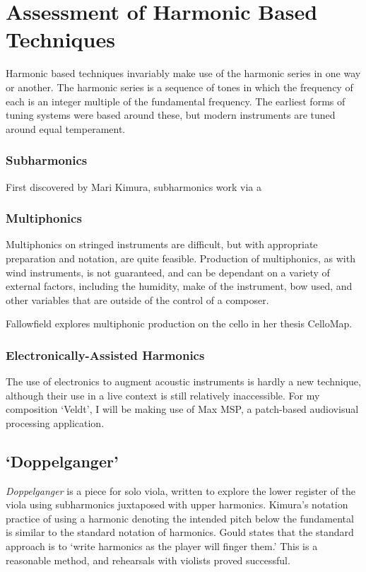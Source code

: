 
\chapter[Assessment of Harmonic Based Techniques]{Assessment of Harmonic Based Techniques}

Harmonic based techniques invariably make use of the harmonic series in one way or another. The harmonic series is a sequence of tones in which the frequency of each is an integer multiple of the fundamental frequency. The earliest forms of tuning systems were based around these, but modern instruments are tuned around equal temperament.

\subsection{Subharmonics}
First discovered by Mari Kimura, subharmonics work via a \lipsum[1]\autocite{kimuraHowProduceSubharmonics1999} 

\subsection{Multiphonics}
Multiphonics on stringed instruments are difficult, but with appropriate preparation and notation, are quite feasible. Production of multiphonics, as with wind instruments, is not guaranteed, and can be dependant on a variety of external factors, including the humidity, make of the instrument, bow used, and other variables that are outside of the control of a composer.

Fallowfield explores multiphonic production on the cello in her thesis CelloMap.\autocite{fallowfieldCelloMapHandbook2009} \lipsum[1]

\subsection{Electronically-Assisted Harmonics}
The use of electronics to augment acoustic instruments is hardly a new technique, although their use in a live context is still relatively inaccessible. For my composition `Veldt', I will be making use of Max MSP, a patch-based audiovisual processing application. 

\newpage
\section{`Doppelganger'}
\textit{Doppelganger} is a piece for solo viola, written to explore the lower register of the viola using subharmonics juxtaposed with upper harmonics. Kimura's notation practice of using a harmonic denoting the intended pitch below the fundamental is similar to the standard notation of harmonics. Gould states that the standard approach is to `write harmonics as the player will finger them.\autocite[413]{gouldBars2011}' This is a reasonable method, and rehearsals with violists proved successful. 

